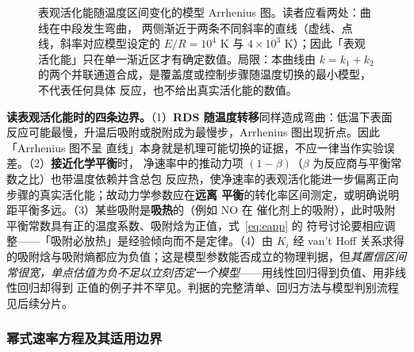 \begin{figure}[htbp]
\centering
{}
\caption{表观活化能随温度区间变化的模型 Arrhenius 图。读者应看两处：曲线在中段发生弯曲，
两侧渐近于两条不同斜率的直线（虚线、点线，斜率对应模型设定的 $E/R=10^{4}$ K 与
$4\times10^{3}$ K）；因此「表观活化能」只在单一渐近区才有确定数值。局限：本曲线由
$k=k_1+k_2$ 的两个并联通道合成，是覆盖度或控制步骤随温度切换的最小模型，不代表任何具体
反应，也不给出真实活化能的数值。\modelmark{}}
\label{fig:arrh-bend}
\end{figure}

\begin{keycond}
\textbf{读表观活化能时的四条边界。}（1）\textbf{RDS 随温度转移}同样造成弯曲：低温下表面
反应可能最慢，升温后吸附或脱附成为最慢步，Arrhenius 图出现折点。因此「Arrhenius 图不呈
直线」本身就是机理可能切换的证据，不应一律当作实验误差。（2）\textbf{接近化学平衡}时，
净速率中的推动力项 $(1-\beta)$（$\beta$ 为反应商与平衡常数之比）也带温度依赖并含总包
反应热，使净速率的表观活化能进一步偏离正向步骤的真实活化能；故动力学参数应在\textbf{远离
平衡}的转化率区间测定，或明确说明距平衡多远。（3）某些吸附是\textbf{吸热}的（例如 NO 在
催化剂上的吸附），此时吸附平衡常数具有正的温度系数、吸附焓为正值，式~\eqref{eq:eapp} 的
符号讨论要相应调整——「吸附必放热」是经验倾向而不是定律。（4）由 $K_i$ 经 van't Hoff
关系求得的吸附焓与吸附熵都应为负值；这是模型参数能否成立的物理判据，但\emph{其置信区间
常很宽，单点估值为负不足以立刻否定一个模型}——用线性回归得到负值、用非线性回归却得到
正值的例子并不罕见。判据的完整清单、回归方法与模型判别流程见后续分片。
\end{keycond}

\subsubsection{幂式速率方程及其适用边界}
\label{sssec:power-vs-hyp}

